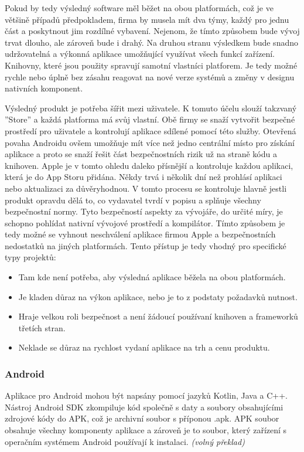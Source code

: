 \documentclass[
  biblatex,
  glossaries,
  index
]{kidiplom}
\begin{document}
Pokud by tedy výsledný software měl běžet na obou platformách, což je ve většině případů předpokladem, firma by musela mít dva týmy, každý pro jednu část a poskytnout jim rozdílné vybavení. Nejenom, že tímto způsobem bude vývoj trvat dlouho, ale zároveň bude i drahý. Na druhou stranu výsledkem bude snadno udržovatelná a výkonná aplikace umožňující využívat všech funkcí zařízení. Knihovny, které jsou použity spravují samotní vlastníci platforem. Je tedy možné rychle nebo úplně bez zásahu reagovat na nové verze systémů a změny v designu nativních komponent. 

Výsledný produkt je potřeba šířit mezi uživatele. K tomuto účelu slouží takzvaný ''Store'' a každá platforma má svůj vlastní. Obě firmy se snaží vytvořit bezpečné prostředí pro uživatele a kontrolují aplikace sdílené pomocí této služby. Otevřená povaha Androidu ovšem umožňuje mít více než jedno centrální místo pro získání aplikace a proto se snaží řešit část bezpečnostních rizik už na straně kódu a knihoven. Apple je v tomto ohledu daleko přísnější a kontroluje každou aplikaci, která je do App Storu přidána. Někdy trvá i několik dní než prohlásí aplikaci nebo aktualizaci za důvěryhodnou. V tomto procesu se kontroluje hlavně jestli produkt opravdu dělá to, co vydavatel tvrdí v popisu a splňuje všechny bezpečnostní normy. Tyto bezpečností aspekty za vývojáře, do určité míry, je schopno pohlídat nativní vývojové prostředí a kompilátor. Tímto způsobem je tedy možné se vyhnout neschválení aplikace firmou Apple a bezpečnostních nedostatků na jiných platformách. Tento přístup je tedy vhodný pro specifické typy projektů:
\begin{itemize}
	\item Tam kde není potřeba, aby výsledná aplikace běžela na obou platformách.
  	\item Je kladen důraz na výkon aplikace, nebo je to z podstaty požadavků nutnost.
  	\item Hraje velkou roli bezpečnost a není žádoucí používaní knihoven a frameworků třetích stran. 
  	\item Neklade se důraz na rychlost vydaní aplikace na trh a cenu produktu.
 \end{itemize}

\subsubsection{Android}
Aplikace pro Android mohou být napsány pomocí jazyků Kotlin, Java a C++. Nástroj Android SDK zkompiluje kód společně s daty a soubory obsahujícími zdrojové kódy do APK, což je archivní soubor s příponou .apk. APK soubor obsahuje všechny komponenty aplikace a zároveň je to soubor, který zařízení s operačním systémem Android používají k instalaci.
\cite{1}
\textit{(volný překlad)}
\end{document}

